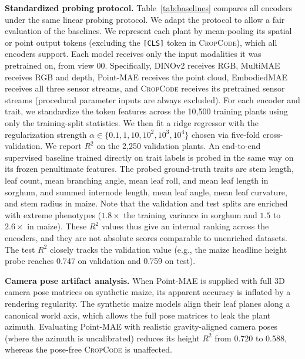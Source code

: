 \documentclass[10pt,twocolumn,letterpaper]{article}
\newcommand{\method}{\textsc{CropCode}}
\begin{document}
\noindent\textbf{Standardized probing protocol.}
Table~\ref{tab:baselines} compares all encoders under the same linear probing protocol. We adapt the protocol to allow a fair evaluation of the baselines. We represent each plant by mean-pooling its spatial or point output tokens (excluding the \texttt{[CLS]} token in \method{}), which all encoders support. Each model receives only the input modalities it was pretrained on, from view 00. Specifically, DINOv2 receives RGB, MultiMAE receives RGB and depth, Point-MAE receives the point cloud, EmbodiedMAE receives all three sensor streams, and \method{} receives its pretrained sensor streams (procedural parameter inputs are always excluded). For each encoder and trait, we standardize the token features across the 10{,}500 training plants using only the training-split statistics. We then fit a ridge regressor with the regularization strength $\alpha \in \{0.1, 1, 10, 10^2, 10^3, 10^4\}$ chosen via five-fold cross-validation. We report $R^2$ on the 2{,}250 validation plants. An end-to-end supervised baseline trained directly on trait labels is probed in the same way on its frozen penultimate features. The probed ground-truth traits are stem length, leaf count, mean branching angle, mean leaf roll, and mean leaf length in sorghum, and summed internode length, mean leaf angle, mean leaf curvature, and stem radius in maize. Note that the validation and test splits are enriched with extreme phenotypes ($1.8\times$ the training variance in sorghum and $1.5$ to $2.6\times$ in maize). These $R^2$ values thus give an internal ranking across the encoders, and they are not absolute scores comparable to unenriched datasets. The test $R^2$ closely tracks the validation value (e.g., the maize headline height probe reaches 0.747 on validation and 0.759 on test).

\noindent\textbf{Camera pose artifact analysis.}
When Point-MAE is supplied with full 3D camera pose matrices on synthetic maize, its apparent accuracy is inflated by a rendering regularity. The synthetic maize models align their leaf planes along a canonical world axis, which allows the full pose matrices to leak the plant azimuth. Evaluating Point-MAE with realistic gravity-aligned camera poses (where the azimuth is uncalibrated) reduces its height $R^2$ from 0.720 to 0.588, whereas the pose-free \method{} is unaffected.
\end{document}
